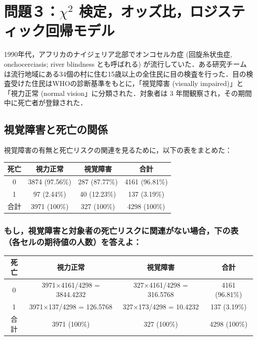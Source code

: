 \documentclass[11pt,]{problemset}
\begin{document}
\hypertarget{chi2-}{%
\section{\texorpdfstring{問題３：\(\chi^2\)
検定，オッズ比，ロジスティック回帰モデル}{問題３：\textbackslash{}chi\^{}2 検定，オッズ比，ロジスティック回帰モデル}}\label{chi2-}}

1990年代，アフリカのナイジェリア北部でオンコセルカ症 (回旋糸状虫症,
onchocerciasis; river blindness とも呼ばれる)
が流行していた．ある研究チームは流行地域にある34個の村に住む15歳以上の全住民に目の検査を行った．目の検査受けた住民はWHOの診断基準をもとに，「視覚障害
(visually impaired)」と「視力正常 (normal vision」に分類された．対象者は
3 年間観察され，その期間中に死亡者が登録された．

\subsection{視覚障害と死亡の関係}

視覚障害の有無と死亡リスクの関連を見るために，以下の表をまとめた：

\begin{center}
\begin{tabular}{|c|c|c|c|}
\hline
死亡 & 視力正常           & 視覚障害          & 合計             \\ \hline
0  & 3874 (97.56\%) & 287 (87.77\%) & 4161 (96.81\%) \\ \hline
1  & 97 (2.44\%)    & 40 (12.23\%)  & 137 (3.19\%)   \\ \hline
合計 & 3971 (100\%)   & 327 (100\%)   & 4298 (100\%)   \\ \hline
\end{tabular}
\end{center}

\subsubsection{もし，視覚障害と対象者の死亡リスクに関連がない場合，下の表（各セルの期待値の人数）を答えよ：}

\begin{center}
\begin{tabular}{|c|c|c|c|}
\hline
死亡 & 視力正常                     & 視覚障害                   & 合計             \\ \hline
0  & 3971$\times$4161/4298 = 3844.4232 & 327$\times$4161/4298 = 316.5768 & 4161 (96.81\%) \\ \hline
1  & 3971$\times$137/4298 = 126.5768   & 327$\times$173/4298 = 10.4232   & 137 (3.19\%)   \\ \hline
合計 & 3971 (100\%)             & 327 (100\%)            & 4298 (100\%)   \\ \hline
\end{tabular}
\end{center}
\end{document}
